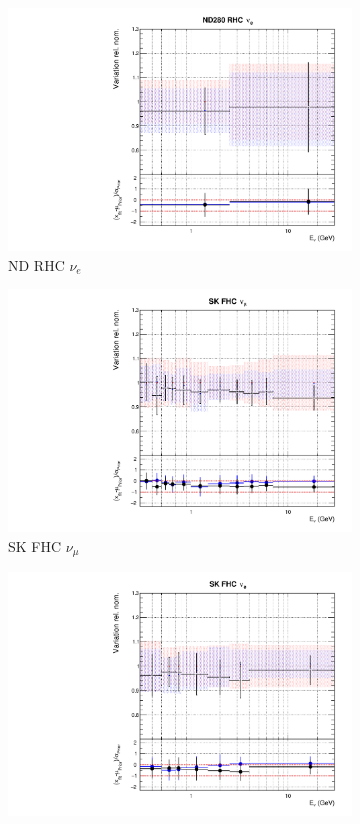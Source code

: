 \begin{figure}[t]
\begin{subfigure}{0.24\textwidth}
  \includegraphics[width=0.95\linewidth]{figs/rhcmpasmvflux7}
  \caption{ND RHC $\nu_e$}
  \label{fig:}
\end{subfigure}
\begin{subfigure}{0.24\textwidth}
  \centering
  \includegraphics[width=0.95\linewidth]{figs/rhcmpasmvflux8}
  \caption{SK FHC $\nu_{\mu}$}
  \label{fig:}
\end{subfigure}
\begin{subfigure}{0.24\textwidth}
  \centering
  \includegraphics[width=0.95\linewidth]{figs/rhcmpasmvflux9}

\end{subfigure}
\end{figure}
